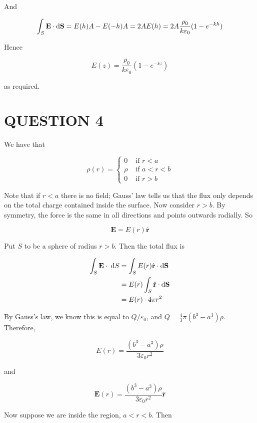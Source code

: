 \documentclass[a4paper]{article}
\begin{document}
And

\begin{align*}
\int_{S} \mathbf{E} \cdot \mathrm{d} \mathbf{S} & = E(h) A - E(-h) A = 2AE(h)  =  2 A \frac{\rho_{0}}{k \varepsilon_{0}} (1 - e^{-kh}) \\
\end{align*}

Hence 

\[ E(z)  =  \frac{\rho_{0}}{k \varepsilon_{0}} (1 - e^{-kz}) \]

as required.




\section{QUESTION 4}

We have that

\[ \rho(r) = \begin{cases} 0  & \text{ if } r < a  \\ \rho & \text{ if } a < r < b \\ 0 & \text{ if } r > b \end{cases} \]


Note that if $ r < a $ there is no field; Gauss' law tells us that the flux only depends on the total charge contained inside the surface. Now consider $ r > b $. By symmetry, the force is the same in all directions and points outwards radially. So

\[  \mathbf{E} = E(r) \hat{\mathbf{r}} \]

Put $ S $ to be a sphere of radius $ r > b $. Then the total flux is 

\begin{align*}
\int_{S} \mathbf{E} \cdot \; \mathrm{d} S  & = \int_{S} E(r) \hat{\mathbf{r}} \cdot \mathrm{d} \mathbf{S} \\
& = E(r) \int_{S}  \hat{\mathbf{r}} \cdot \mathrm{d} \mathbf{S} \\
& = E(r) \cdot 4 \pi r^{2}
\end{align*}

By Gauss's law, we know this is equal to $ Q/\varepsilon_{0} $, and $ Q = \frac{4}{3} \pi (b^{3} - a^{3}) \rho $. Therefore,

\[ E(r) = \frac{ (b^{3} - a^{3}) \rho}{3\varepsilon_{0}r^{2}} \]

and

\[  \mathbf{E}(r) = \frac{ (b^{3} - a^{3})\rho}{3\varepsilon_{0}r^{2}} \hat{\mathbf{r}}  \]


Now suppose we are inside the region, $ a < r < b $. Then
\end{document}
